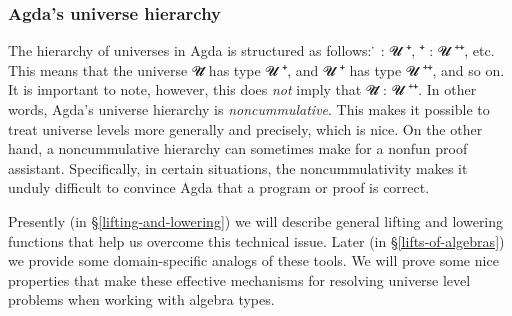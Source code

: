 \subsubsection{Agda's universe hierarchy}\label{agdas-universe-hierarchy}



The hierarchy of universes in Agda is structured as follows: \af ̇ \as : \ab 𝓤 \af ⁺\af ̇, \hskip3mm
 \af ⁺\af ̇ \as : \ab 𝓤 \af ⁺\af ⁺\af ̇, etc. This means that the universe \ab 𝓤\af ̇ has type \ab 𝓤  \af ⁺\af ̇, and 𝓤 \af ⁺\af ̇ has type \ab 𝓤 \af ⁺\af ⁺\af ̇, and so on.  It is important to note, however, this does \emph{not} imply that \ab 𝓤\af ̇ \as : \ab 𝓤 \af ⁺\af ⁺\af ̇. In other words, Agda's universe hierarchy is \emph{noncummulative}. This makes it possible to treat universe levels more generally and precisely, which is nice. On the other hand, a noncummulative hierarchy can sometimes make for a nonfun proof assistant. Specifically, in certain situations, the noncummulativity makes it unduly difficult to convince Agda that a program or proof is correct. 

Presently (in \S\ref{lifting-and-lowering}) we will describe general lifting and lowering functions that help us overcome this technical issue. Later (in \S\ref{lifts-of-algebras}) we provide some domain-specific analogs of these tools. We will prove some nice properties that make these effective mechanisms for resolving universe level problems when working with algebra types.

